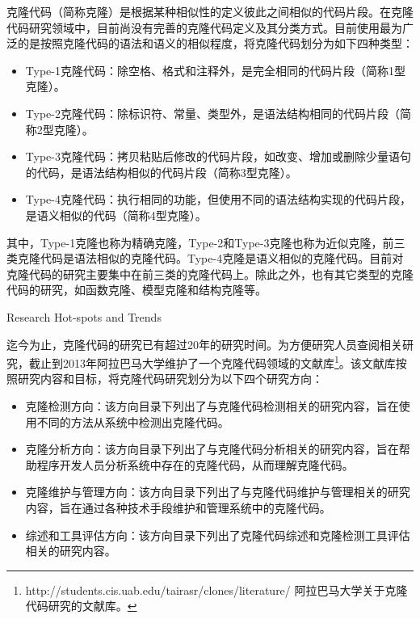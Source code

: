 克隆代码（简称克隆）是根据某种相似性的定义彼此之间相似的代码片段\cite{roy2007survey}。在克隆代码研究领域中，目前尚没有完善的克隆代码定义及其分类方式。目前使用最为广泛的是按照克隆代码的语法和语义的相似程度，将克隆代码划分为如下四种类型\cite{koschke2007survey}：
\begin{itemize}
\item 
Type-1克隆代码：除空格、格式和注释外，是完全相同的代码片段（简称1型克隆）。
\item 
Type-2克隆代码：除标识符、常量、类型外，是语法结构相同的代码片段（简称2型克隆）。
\item 
Type-3克隆代码：拷贝粘贴后修改的代码片段，如改变、增加或删除少量语句的代码，是语法结构相似的代码片段（简称3型克隆）。
\item 
Type-4克隆代码：执行相同的功能，但使用不同的语法结构实现的代码片段，是语义相似的代码（简称4型克隆）。
\end{itemize}

其中，Type-1克隆也称为精确克隆，Type-2和Type-3克隆也称为近似克隆，前三类克隆代码是语法相似的克隆代码。Type-4克隆是语义相似的克隆代码。目前对克隆代码的研究主要集中在前三类的克隆代码上。除此之外，也有其它类型的克隆代码的研究，如函数克隆\cite{roy2008empirical}、模型克隆\cite{alalfi2012models}和结构克隆\cite{basit2009data}\cite{basit2005detecting}等。%

{Research Hot-spots and Trends}

迄今为止，克隆代码的研究已有超过20年的研究时间。为方便研究人员查阅相关研究，截止到2013年阿拉巴马大学维护了一个克隆代码领域的文献库\footnote{ http://students.cis.uab.edu/tairasr/clones/literature/ 阿拉巴马大学关于克隆代码研究的文献库。}。该文献库按照研究内容和目标，将克隆代码研究划分为以下四个研究方向：

\begin{itemize}
\item 
克隆检测方向：该方向目录下列出了与克隆代码检测相关的研究内容，旨在使用不同的方法从系统中检测出克隆代码。
\item 
克隆分析方向：该方向目录下列出了与克隆代码分析相关的研究内容，旨在帮助程序开发人员分析系统中存在的克隆代码，从而理解克隆代码。
\item 
克隆维护与管理方向：该方向目录下列出了与克隆代码维护与管理相关的研究内容，旨在通过各种技术手段维护和管理系统中的克隆代码。
\item 
综述和工具评估方向：该方向目录下列出了克隆代码综述和克隆检测工具评估相关的研究内容。
\end{itemize}

